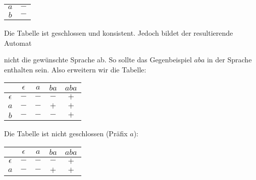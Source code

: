 \documentclass[11pt,a4paper]{article}
\begin{document}
\begin{loesung}
\begin{enumerate}
\begin{table}[h!]
\begin{tabular}{c|c}
                \hline
                $a$ & $-$ \\
                $b$ & $-$ \\
            \end{tabular}
        \end{table}
        \FloatBarrier
        Die Tabelle ist geschlossen und konsistent.
        Jedoch bildet der resultierende Automat
        \begin{figure*}[h!]
            \centering
        \end{figure*}
        \FloatBarrier
        nicht die gewünschte Sprache ab. So sollte das Gegenbeispiel $aba$ in der Sprache enthalten sein.
        Also erweitern wir die Tabelle:
        \begin{table}[h!]
            \centering
            \begin{tabular}{c|cccc}
                & $\epsilon$ & $a$ & $ba$ & $aba$ \\
                \hline
                $\epsilon$ & $-$ & $-$ & $-$ & $+$ \\
                \hline
                $a$ & $-$ & $-$ & $+$ & $+$ \\
                $b$ & $-$ & $-$ & $-$ & $+$ \\
            \end{tabular}
        \end{table}
        \FloatBarrier
        Die Tabelle ist nicht geschlossen (Präfix $a$):
        \begin{table}[h!]
            \centering
            \begin{tabular}{c|cccc}
                & $\epsilon$ & $a$ & $ba$ & $aba$ \\
                \hline
                $\epsilon$ & $-$ & $-$ & $-$ & $+$ \\
                $a$ & $-$ & $-$ & $+$ & $+$ \\
                \hline

\end{tabular}
\end{table}
\end{enumerate}
\end{loesung}
\end{document}
